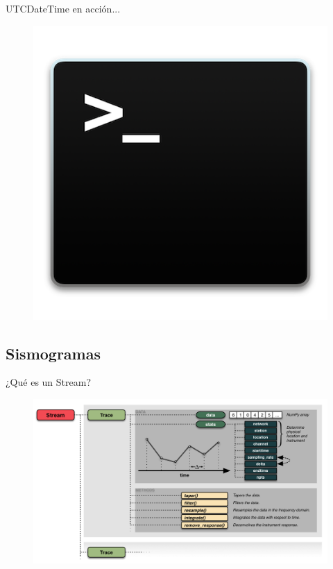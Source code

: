 \documentclass[11pt]{beamer}
\begin{document}
\begin{frame}
UTCDateTime en acción...
\begin{figure}
\includegraphics[scale=0.5]{terminal.png}
\end{figure}
\end{frame}

\subsection{Sismogramas}
\begin{frame}{¿Qué es un Stream?}
\begin{figure}
\begin{center}
\includegraphics[scale=0.15]{stream.png}
\end{center}
\end{figure}
\end{frame}
\end{document}

